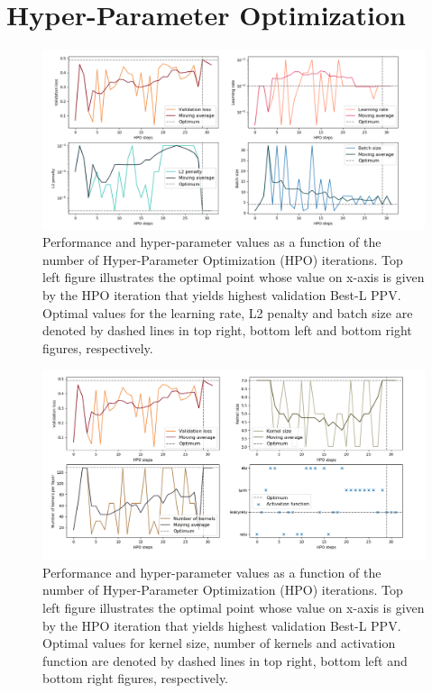 \section{Hyper-Parameter Optimization}

    \begin{figure}[H]
        \begin{center}
            \includegraphics[width=\textwidth, keepaspectratio]{imgs/hpo.png}
            \caption{Performance and hyper-parameter values as a function of the number
            of Hyper-Parameter Optimization (HPO) iterations.
            Top left figure illustrates the optimal point whose value on x-axis
            is given by the HPO iteration that yields highest validation Best-L PPV.
            Optimal values for the learning rate, L2 penalty and batch size are denoted
            by dashed lines in top right, bottom left and bottom right figures, respectively.}
            \label{hpoparams}
        \end{center}
    \end{figure}

    \begin{figure}[H]
        \begin{center}
            \includegraphics[width=\textwidth, keepaspectratio]{imgs/hpo2.png}
            \caption{Performance and hyper-parameter values as a function of the number
            of Hyper-Parameter Optimization (HPO) iterations.
            Top left figure illustrates the optimal point whose value on x-axis
            is given by the HPO iteration that yields highest validation Best-L PPV.
            Optimal values for kernel size, number of kernels and activation function are denoted
            by dashed lines in top right, bottom left and bottom right figures, respectively.}
            \label{hpoparams2}
        \end{center}
    \end{figure}

